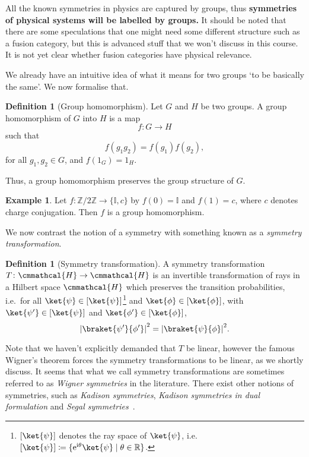 \documentclass[a4 paper, 12pt]{book}
\renewcommand{\mathcal}{\cmmathcal}
\theoremstyle{definition}
\newtheorem{definition}[theorem]{Definition}
\newtheorem{example}[theorem]{Example}
\newcommand{\rr}{\mathbb{R}}
\newcommand{\ii}{\mathbb{I}}
\newcommand{\zz}{\mathbb{Z}}
\renewcommand{\i}{\mathrm{i}}
\newcommand{\e}{\mathrm{e}}
\DeclarePairedDelimiter{\abs}{\lvert}{\rvert}
\newcommand{\hilbert}{\mathcal{H}}
\begin{document}
	All the known symmetries in physics are captured by groups, thus \textbf{symmetries of physical systems will be labelled by groups.} It should be noted that there are some speculations that one might need some different structure such as a fusion category, but this is advanced stuff that we won't discuss in this course. It is not yet clear whether fusion categories have physical relevance.

	We already have an intuitive idea of what it means for two groups `to be basically the same'. We now formalise that.
	\begin{definition}[Group homomorphism]
	    Let \(G\) and \(H\) be two groups. A group homomorphism of \(G\) into \(H\) is a map
		\begin{equation*}
			f \colon G \rightarrow H
		\end{equation*}
		such that
		\begin{equation*}
			f(g_1 g_2) = f(g_1) f(g_2),
		\end{equation*}
		for all \(g_1, g_2 \in G\), and \(f(1_G) = 1_H\).
	\end{definition}
	\noindent Thus, a group homomorphism preserves the group structure of \(G\).

	\begin{example}
		Let \(f \colon \zz/2\zz \rightarrow \{\ii, c\}\) by \(f(0) = \ii\) and \(f(1) = c\), where \(c\) denotes charge conjugation. Then \(f\) is a group homomorphism.
	\end{example}

	We now contrast the notion of a symmetry with something known as a \textit{symmetry transformation}.
	\begin{definition}[Symmetry transformation]
		A symmetry transformation \(T \colon \hilbert \rightarrow \hilbert\) is an invertible transformation of rays in a Hilbert space \(\hilbert\) which preserves the transition probabilities, i.e.\ for all \(\ket{\psi} \in [\ket{\psi}]\)\footnote{\([\ket{\psi}]\) denotes the ray space of \(\ket{\psi}\), i.e.\ \([\ket{\psi}] \coloneq \{\e^{\i\theta}\ket{\psi} \mid \theta\in\rr\}\).} and \(\ket{\phi} \in [\ket{\phi}]\), with \(\ket{\psi'} \in [\ket{\psi}]\) and \(\ket{\phi'} \in [\ket{\phi}]\),
		\begin{equation*}
			{\abs{\braket{\psi'}{\phi'}}}^2 = {\abs{\braket{\psi}{\phi}}}^2.
		\end{equation*}
	\end{definition}
	\noindent Note that we haven't explicitly demanded that \(T\) be linear, however the famous Wigner's theorem forces the symmetry transformations to be linear, as we shortly discuss. It seems that what we call symmetry transformations are sometimes referred to as \textit{Wigner symmetries} in the literature. There exist other notions of symmetries, such as \textit{Kadison symmetries}, \textit{Kadison symmetries in dual formulation} and \textit{Segal symmetries}~\cite{Moretti_symmetry_definition}\cite[chp.~12]{Moretti}.
\end{document}
